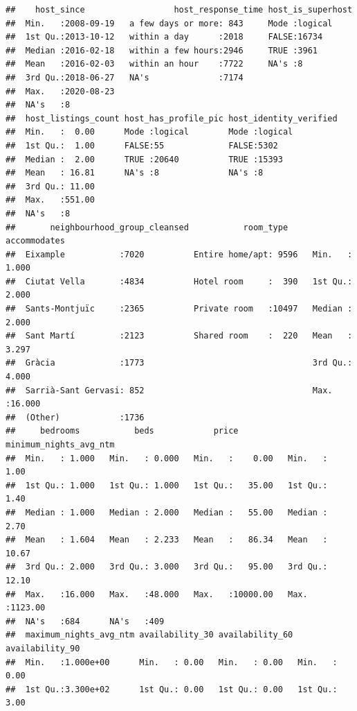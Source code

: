\begin{verbatim}
##    host_since                  host_response_time host_is_superhost
##  Min.   :2008-09-19   a few days or more: 843     Mode :logical    
##  1st Qu.:2013-10-12   within a day      :2018     FALSE:16734      
##  Median :2016-02-18   within a few hours:2946     TRUE :3961       
##  Mean   :2016-02-03   within an hour    :7722     NA's :8          
##  3rd Qu.:2018-06-27   NA's              :7174                      
##  Max.   :2020-08-23                                                
##  NA's   :8                                                         
##  host_listings_count host_has_profile_pic host_identity_verified
##  Min.   :  0.00      Mode :logical        Mode :logical         
##  1st Qu.:  1.00      FALSE:55             FALSE:5302            
##  Median :  2.00      TRUE :20640          TRUE :15393           
##  Mean   : 16.81      NA's :8              NA's :8               
##  3rd Qu.: 11.00                                                 
##  Max.   :551.00                                                 
##  NA's   :8                                                      
##       neighbourhood_group_cleansed           room_type      accommodates   
##  Eixample           :7020          Entire home/apt: 9596   Min.   : 1.000  
##  Ciutat Vella       :4834          Hotel room     :  390   1st Qu.: 2.000  
##  Sants-Montjuïc     :2365          Private room   :10497   Median : 2.000  
##  Sant Martí         :2123          Shared room    :  220   Mean   : 3.297  
##  Gràcia             :1773                                  3rd Qu.: 4.000  
##  Sarrià-Sant Gervasi: 852                                  Max.   :16.000  
##  (Other)            :1736                                                  
##     bedrooms           beds            price          minimum_nights_avg_ntm
##  Min.   : 1.000   Min.   : 0.000   Min.   :    0.00   Min.   :   1.00       
##  1st Qu.: 1.000   1st Qu.: 1.000   1st Qu.:   35.00   1st Qu.:   1.40       
##  Median : 1.000   Median : 2.000   Median :   55.00   Median :   2.70       
##  Mean   : 1.604   Mean   : 2.233   Mean   :   86.34   Mean   :  10.67       
##  3rd Qu.: 2.000   3rd Qu.: 3.000   3rd Qu.:   95.00   3rd Qu.:  12.10       
##  Max.   :16.000   Max.   :48.000   Max.   :10000.00   Max.   :1123.00       
##  NA's   :684      NA's   :409                                               
##  maximum_nights_avg_ntm availability_30 availability_60 availability_90
##  Min.   :1.000e+00      Min.   : 0.00   Min.   : 0.00   Min.   : 0.00  
##  1st Qu.:3.300e+02      1st Qu.: 0.00   1st Qu.: 0.00   1st Qu.: 3.00  

\end{verbatim}
